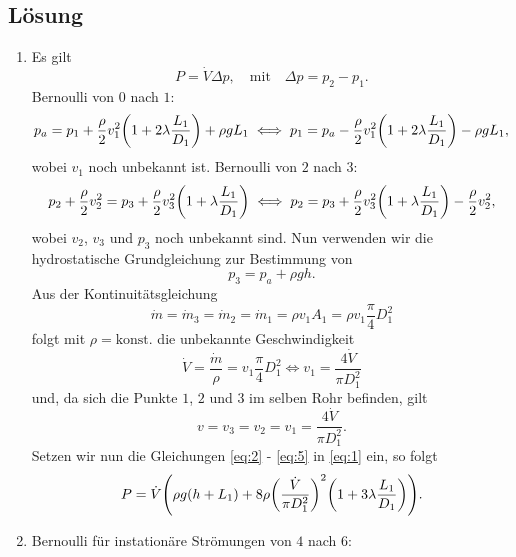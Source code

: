 \documentclass{exercise}
\begin{document}
    \subsection*{Lösung}
    \begin{enumerate}
        \item Es gilt
        \begin{equation}\label{eq:1}
            P = \dot{V}\Delta p, \quad \text{mit} \quad \Delta p = p_2 - p_1.
        \end{equation}
        Bernoulli von \(0\) nach \(1\):
        \begin{equation}\label{eq:2}
            p_a = p_1 + \frac{\rho}{2}v_1^2 \parentheses*{1 + 2\lambda\frac{L_1}{D_1}} + \rho gL_1 \iff p_1 = p_a - \frac{\rho}{2}v_1^2 \parentheses*{1 + 2\lambda\frac{L_1}{D_1}} - \rho gL_1,
        \end{equation}
        wobei \(v_1\) noch unbekannt ist.
        Bernoulli von \(2\) nach \(3\):
        \begin{equation}
            p_2 + \frac{\rho}{2}v_2^2 = p_3 + \frac{\rho}{2}v_3^2 \parentheses*{1 + \lambda\frac{L_1}{D_1}} \iff p_2 = p_3 + \frac{\rho}{2}v_3^2 \parentheses*{1 + \lambda\frac{L_1}{D_1}} - \frac{\rho}{2}v_2^2,
        \end{equation}
        wobei \(v_2\), \(v_3\) und \(p_3\) noch unbekannt sind.
        Nun verwenden wir die hydrostatische Grundgleichung zur Bestimmung von
        \begin{equation}
            p_3 = p_a + \rho gh.
        \end{equation}
        Aus der Kontinuitätsgleichung
        \[
            \dot{m} = \dot{m}_3 = \dot{m}_2 = \dot{m}_1 = \rho v_1 A_1 = \rho v_1 \frac{\pi}{4}D_1^2
        \]
        folgt mit \(\rho = \text{konst.}\) die unbekannte Geschwindigkeit
        \[
            \dot{V} = \frac{\dot{m}}{\rho} = v_1 \frac{\pi}{4}D_1^2 \iff v_1 = \frac{4\dot{V}}{\pi D_1^2}
        \]
        und, da sich die Punkte \(1\), \(2\) und \(3\) im selben Rohr befinden, gilt
        \begin{equation}\label{eq:5}
            v = v_3 = v_2 = v_1 = \frac{4\dot{V}}{\pi D_1^2}.
        \end{equation}
        Setzen wir nun die Gleichungen \eqref{eq:2} - \eqref{eq:5} in \eqref{eq:1} ein, so folgt
        \[
            P = \dot{V}\parentheses*{\rho g\parentheses*{h + L_1} + 8\rho\parentheses*{\frac{\dot{V}}{\pi D_1^2}}^2\parentheses*{1 + 3\lambda\frac{L_1}{D_1}}}.
        \]
        \item Bernoulli für instationäre Strömungen von \(4\) nach \(6\):

\end{enumerate}
\end{document}
